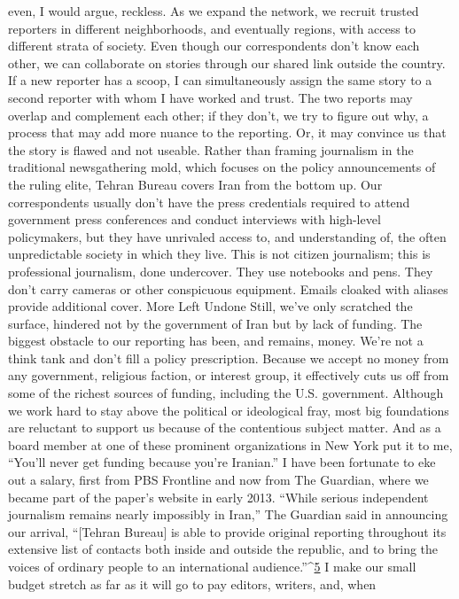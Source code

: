 even, I would argue, reckless.
As we expand the network, we recruit trusted reporters in different neighborhoods, and
eventually regions, with access to different strata of society. Even though our
correspondents don’t know each other, we can collaborate on stories through our shared
link outside the country. If a new reporter has a scoop, I can simultaneously assign the
same story to a second reporter with whom I have worked and trust. The two reports may
overlap and complement each other; if they don’t, we try to figure out why, a process that
may add more nuance to the reporting. Or, it may convince us that the story is flawed and
not useable.
Rather than framing journalism in the traditional newsgathering mold, which focuses on
the policy announcements of the ruling elite, Tehran Bureau covers Iran from the bottom
up. Our correspondents usually don’t have the press credentials required to attend
government press conferences and conduct interviews with high-level policymakers, but
they have unrivaled access to, and understanding of, the often unpredictable society in
which they live. This is not citizen journalism; this is professional journalism, done
undercover. They use notebooks and pens. They don’t carry cameras or other
conspicuous equipment. Emails cloaked with aliases provide additional cover.
More Left Undone
Still, we’ve only scratched the surface, hindered not by the government of Iran but by
lack of funding. The biggest obstacle to our reporting has been, and remains, money.
We’re not a think tank and don’t fill a policy prescription. Because we accept no money
from any government, religious faction, or interest group, it effectively cuts us off from
some of the richest sources of funding, including the U.S. government. Although we
work hard to stay above the political or ideological fray, most big foundations are
reluctant to support us because of the contentious subject matter. And as a board member
at one of these prominent organizations in New York put it to me, ``You’ll never get
funding because you’re Iranian.''
I have been fortunate to eke out a salary, first from PBS Frontline and now from The
Guardian, where we became part of the paper’s website in early 2013. ``While serious
independent journalism remains nearly impossibly in Iran,'' The Guardian said in
announcing our arrival, ``[Tehran Bureau] is able to provide original reporting throughout
its extensive list of contacts both inside and outside the republic, and to bring the voices
of ordinary people to an international audience.''^{\href{#endnotes}{5}}
I make our small budget stretch as far as it will go to pay editors, writers, and, when
